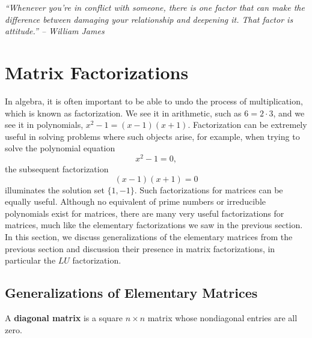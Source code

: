 
\begin{center} 
\emph{``Whenever you're in conflict with someone, there is one factor that can make the difference between damaging your relationship and deepening it. That factor is attitude.'' -- William James}
\end{center}

\section{Matrix Factorizations}\label{sec:lu}
In algebra, it is often important to be able to undo the process of multiplication, which is known as factorization. We see it in arithmetic, such as $6 = 2\cdot 3$, and we see it in polynomials, $x^2-1 = (x-1)(x+1)$. Factorization can be extremely useful in solving problems where such objects arise, for example, when trying to solve the polynomial equation \[x^2-1=0,\] the subsequent factorization \[(x-1)(x+1) = 0\] illuminates the solution set $\{1, -1\}$. Such factorizations for matrices can be equally useful. Although no equivalent of prime numbers or irreducible polynomials exist for matrices, there are many very useful factorizations for matrices, much like the elementary factorizations we saw in the previous section. In this section, we discuss generalizations of the elementary matrices from the previous section and discussion their presence in matrix factorizations, in particular the $LU$ factorization.\\

\subsection{Generalizations of Elementary Matrices}
\begin{Def}\label{def:diagonal}  A \textbf{diagonal matrix} is a square $n\times n$ matrix whose nondiagonal entries are all zero.
\end{Def}

